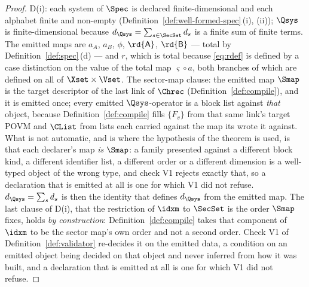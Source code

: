 \begin{proof}
D(i): each system of $\Spec$ is declared finite-dimensional and each alphabet
finite and non-empty (Definition~\ref{def:well-formed-spec}\,(i), (ii)); $\Qsys$ is finite-dimensional
because $d_{\Qsys}=\sum_{s\in\SecSet}d_s$ is a finite sum of finite terms. The
emitted maps are $a_A$, $a_B$, $\phi$, $\rd{\mathsf A}$, $\rd{\mathsf B}$ ---
total by Definition~\ref{def:spec}\,(d) --- and $r$, which is total because
\eqref{eq:rdef} is defined by a case distinction on the value of the total map
$\varsigma\circ a$, both branches of which are defined on all of
$\Xset\times\Vset$. The sector-map clause: the emitted map $\Smap$ is the
target descriptor of the last link of $\Chrec$
(Definition~\ref{def:compile}), and it is emitted once; every emitted
$\Qsys$-operator is a block list against \emph{that} object, because
Definition~\ref{def:compile} fills $\{F_v\}$ from that same link's target POVM
and $\CList$ from lists each carried against the map its  wrote
it against. What is not automatic, and is where the hypothesis of the theorem
is used, is that each declarer's map \emph{is} $\Smap$: a family presented
against a different block kind, a different identifier list, a different order
or a different dimension is a well-typed object of the wrong type, and check
V1 rejects exactly that, so a declaration that is emitted at all is one for
which V1 did not refuse. $d_{\Qsys}=\sum_sd_s$ is then the identity that
defines $d_{\Qsys}$ from the emitted map. The last clause of D(i), that the
restriction of $\idxm$ to $\SecSet$ is the order $\Smap$ fixes, holds
\emph{by construction}: Definition~\ref{def:compile} takes that component of
$\idxm$ to be the sector map's own order and not a second order. Check V1 of
Definition~\ref{def:validator} re-decides it on the emitted data, a condition
on an emitted object being decided on that object and never inferred from how
it was built, and a declaration that is emitted at all is one for which V1 did
not refuse.


\end{proof}
